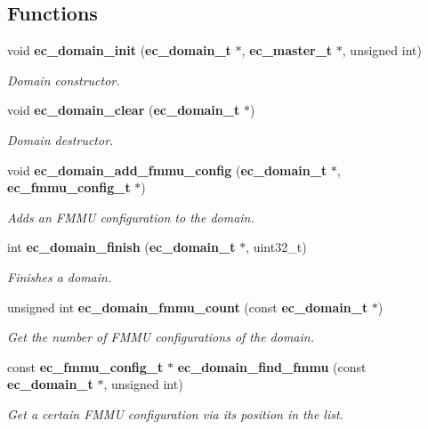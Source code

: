 \subsection*{Functions}
\begin{DoxyCompactItemize}
\item 
void {\bf ec\-\_\-domain\-\_\-init} ({\bf ec\-\_\-domain\-\_\-t} $\ast$, {\bf ec\-\_\-master\-\_\-t} $\ast$, unsigned int)\label{domain_8h_a62277a562703ecfbf3aad9e3b0ad8c75}

\begin{DoxyCompactList}\small\item\em Domain constructor. \end{DoxyCompactList}\item 
void {\bf ec\-\_\-domain\-\_\-clear} ({\bf ec\-\_\-domain\-\_\-t} $\ast$)\label{domain_8h_a0673cfe6b046dbc8160068ef776fd0b1}

\begin{DoxyCompactList}\small\item\em Domain destructor. \end{DoxyCompactList}\item 
void {\bf ec\-\_\-domain\-\_\-add\-\_\-fmmu\-\_\-config} ({\bf ec\-\_\-domain\-\_\-t} $\ast$, {\bf ec\-\_\-fmmu\-\_\-config\-\_\-t} $\ast$)\label{domain_8h_a145e578c728c987fb2764ea7c30439f1}

\begin{DoxyCompactList}\small\item\em Adds an F\-M\-M\-U configuration to the domain. \end{DoxyCompactList}\item 
int {\bf ec\-\_\-domain\-\_\-finish} ({\bf ec\-\_\-domain\-\_\-t} $\ast$, uint32\-\_\-t)
\begin{DoxyCompactList}\small\item\em Finishes a domain. \end{DoxyCompactList}\item 
unsigned int {\bf ec\-\_\-domain\-\_\-fmmu\-\_\-count} (const {\bf ec\-\_\-domain\-\_\-t} $\ast$)\label{domain_8h_ae3b2fb4aa807084750214357bdba897a}

\begin{DoxyCompactList}\small\item\em Get the number of F\-M\-M\-U configurations of the domain. \end{DoxyCompactList}\item 
const {\bf ec\-\_\-fmmu\-\_\-config\-\_\-t} $\ast$ {\bf ec\-\_\-domain\-\_\-find\-\_\-fmmu} (const {\bf ec\-\_\-domain\-\_\-t} $\ast$, unsigned int)
\begin{DoxyCompactList}\small\item\em Get a certain F\-M\-M\-U configuration via its position in the list. \end{DoxyCompactList}\end{DoxyCompactItemize}



